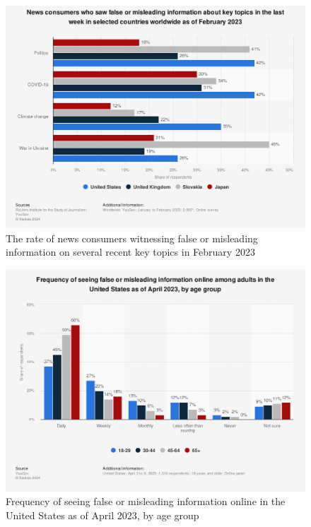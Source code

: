 \begin{figure}[htbp]
    \centering
    \includegraphics[width=0.9\linewidth]{images/statistic_id1317019_consumers-witnessing-false-information-on-certain-topics-worldwide-2023.png}
    \caption{The rate of news consumers witnessing false or misleading information on several recent key topics in February 2023 \cite{reuters-2023-false-info}}
    \label{fig:consumers-witnessing-false-information-on-certain-topics-worldwide-2023}
\end{figure}


\begin{figure}[htbp]
    \centering
    \includegraphics[width=0.9\linewidth]{images/statistic_id1462057_frequency-of-seeing-false-information-online-in-the-us-2023-by-age-group.png}
    \caption{Frequency of seeing false or misleading information online in the United States as of April 2023, by age group \cite{yougov-2023-frequency}}
    \label{fig:frequency-of-seeing-false-information-online-in-the-us-2023-by-age-group}
\end{figure}

